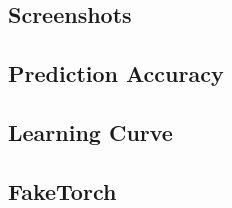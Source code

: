 \subsection{Screenshots}

\subsection{Prediction Accuracy}

\subsection{Learning Curve}

\subsection{FakeTorch}